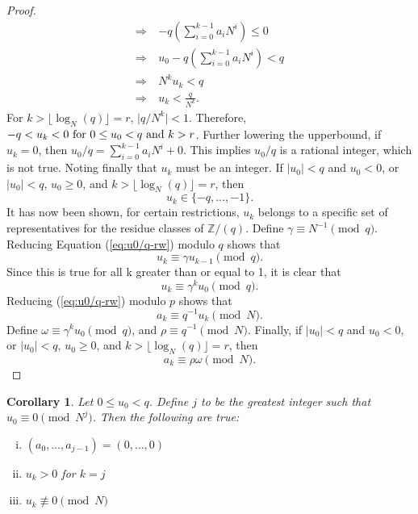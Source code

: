 \documentclass[english]{article}
\def\zzz{\mathbb{Z}}
\theoremstyle{plain}
\newtheorem{corollary}[theorem]{Corollary}%
\theoremstyle{definition}
\theoremstyle{remark}
\begin{document}
\begin{proof}
\begin{align*}
    \Rightarrow &-q\left(\sum_{i=0}^{k-1}a_iN^i\right) \leq 0 \\
    \Rightarrow \ &u_0-q\left(\sum_{i=0}^{k-1}a_iN^i\right)<q \\
    \Rightarrow \ &N^ku_k<q \\
    \Rightarrow \ &u_k<\frac{q}{N^k}.
  \end{align*}
  For $k>\lfloor\log_N(q)\rfloor=r$, $\lvert q/N^k \rvert < 1$. Therefore,
  $-q < u_k < 0 \ {\rm for} \ 0\leq u_0 < q \ {\rm and} \ k>r$.
  Further lowering the upperbound, if $u_k=0$, then
  $u_0/q=\sum_{i=0}^{k-1}a_iN^i+0$. This implies $u_0/q$ is a rational
  integer, which is not true. Noting finally that $u_k$ must be an integer.
  If $\lvert u_0 \rvert<q$ and $u_0<0$, or $\lvert u_0 \rvert<q$,
  $u_0\geq0$, and $k>\lfloor \log_N(q) \rfloor=r$, then
  \begin{equation*}
    u_k \in \{-q,\dots,-1\}.
  \end{equation*}
  It has now been shown, for certain restrictions, $u_k$ belongs to a
  specific set of representatives for the residue classes of $\zzz/(q)$.
  Define $\gamma \equiv N^{-1} \pmod q$. Reducing Equation
  (\ref{eq:u0/q-rw}) modulo $q$ shows that
  \begin{equation}
    u_k \equiv \gamma u_{k-1} \pmod q.
  \end{equation}
  Since this is true for all k greater than or equal to 1, it is clear that
  \begin{equation}\label{eq:uk-mod-q}
    u_k \equiv \gamma^ku_0 \pmod q.
  \end{equation}
  Reducing (\ref{eq:u0/q-rw}) modulo $p$ shows that
  \begin{equation}\label{eq:ak-mod-p}
    a_k \equiv q^{-1}u_k \pmod N.
  \end{equation}
  Define $\omega \equiv \gamma^k u_0 \pmod q$, and
  $\rho \equiv q^{-1} \pmod N$.  Finally, if $\lvert u_0 \rvert<q$ and
  $u_0<0$, or $\lvert u_0 \rvert<q$, $u_0\geq0$, and
  $k>\lfloor \log_N(q) \rfloor=r$, then
  \begin{equation}\label{eq:ak-done}
    a_k \equiv \rho\omega \pmod N.
  \end{equation}
\end{proof}
\begin{corollary}\label{cor:aj}
  Let $0\leq u_0 < q$. Define $j$ to be the greatest integer such that
  $u_0 \equiv 0 \pmod{N^j}$. Then the following are true:
  \begin{enumerate}[i.]
    \item $(a_0,\dots,a_{j-1})=(0,\dots,0)$
    \item $u_k>0$ for $k=j$
    \item $u_k \not\equiv 0 \pmod N$
  \end{enumerate}
\end{corollary}
\end{document}
